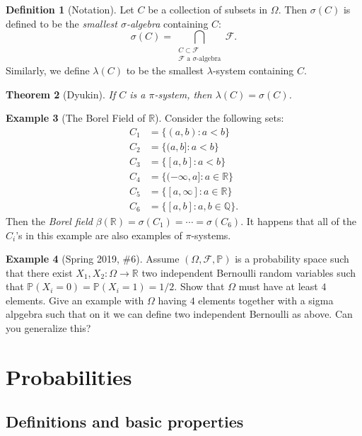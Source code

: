 \documentclass[12pt,reqno]{article}
\renewcommand{\emph}[1]{\textit{#1}}
\theoremstyle{plain}
\newtheorem{theorem}{Theorem}[section]
\theoremstyle{definition}
\newtheorem{definition}[theorem]{Definition}
\newtheorem{example}[theorem]{Example}
\newcommand{\PP}[1]{\ensuremath{\mathbb{P}\left(#1\right)}}
\begin{document}
\begin{definition}[Notation]
Let $C$ be a collection of subsets in $\Omega$. Then $\sigma(C)$ is defined 
to be the \emph{smallest $\sigma$-algebra} containing $C$: 
\[
\sigma(C) = \bigcap_{\substack{C \subset \mathcal{F} \\ 
     \mathcal{F} \text{ a\ $\sigma$-algebra}}} \mathcal{F}. 
\]
Similarly, we define $\lambda(C)$ to be the smallest $\lambda$-system 
containing $C$. 
\end{definition} 

\begin{theorem}[Dyukin]
If $C$ is a $\pi$-system, then $\lambda(C) = \sigma(C)$. 
\end{theorem} 

\begin{example}[The Borel Field of $\mathbb{R}$] 
Consider the following sets:
\begin{align*} 
C_1 & = \{(a,b): a < b\} \\ 
C_2 & = \{(a,b]: a < b\} \\ 
C_3 & = \{[a,b]: a < b\} \\ 
C_4 & = \{(-\infty, a]: a \in \mathbb{R}\} \\ 
C_5 & = \{[a,\infty]: a \in \mathbb{R}\} \\ 
C_6 & = \{[a,b]: a,b \in \mathbb{Q}\}. 
\end{align*} 
Then the \emph{Borel field} 
$\beta(\mathbb{R}) = \sigma(C_1) = \cdots = \sigma(C_6)$. It happens that 
all of the $C_i$'s in this example are also examples of $\pi$-systems. 
\end{example} 

\begin{example}[Spring 2019, \#6]
Assume $(\Omega, \mathcal{F}, \mathbb{P})$ is a probability space such that 
there exist $X_1,X_2: \Omega \rightarrow \mathbb{R}$ two independent 
Bernoulli random variables such that $\PP{X_i = 0} = \PP{X_i = 1} = 1/2$. 
Show that $\Omega$ must have at least $4$ elements. 
Give an example with $\Omega$ having $4$ elements together with a 
sigma alpgebra such that on it we can define two independent Bernoulli as 
above. 
Can you generalize this? 
\end{example} 

\newpage 
\section{Probabilities}

\subsection{Definitions and basic properties} 
\end{document}
